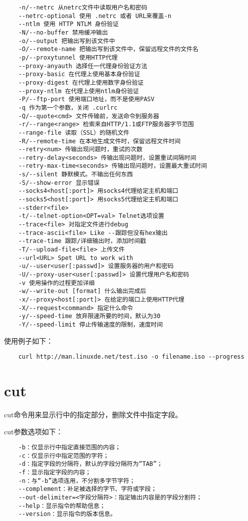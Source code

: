 \documentclass[a4paper,left=2.5cm,right=2.5cm,11pt]{article}
\begin{document}
\begin{lstlisting}
	-n/--netrc 从netrc文件中读取用户名和密码 
	--netrc-optional 使用 .netrc 或者 URL来覆盖-n 
	--ntlm 使用 HTTP NTLM 身份验证 
	-N/--no-buffer 禁用缓冲输出 
	-o/--output 把输出写到该文件中 
	-O/--remote-name 把输出写到该文件中，保留远程文件的文件名 
	-p/--proxytunnel 使用HTTP代理 
	--proxy-anyauth 选择任一代理身份验证方法 
	--proxy-basic 在代理上使用基本身份验证 
	--proxy-digest 在代理上使用数字身份验证 
	--proxy-ntlm 在代理上使用ntlm身份验证 
	-P/--ftp-port 使用端口地址，而不是使用PASV 
	-q 作为第一个参数，关闭 .curlrc 
	-Q/--quote<cmd> 文件传输前，发送命令到服务器 
	-r/--range<range> 检索来自HTTP/1.1或FTP服务器字节范围 
	--range-file 读取（SSL）的随机文件 
	-R/--remote-time 在本地生成文件时，保留远程文件时间 
	--retry<num> 传输出现问题时，重试的次数 
	--retry-delay<seconds> 传输出现问题时，设置重试间隔时间 
	--retry-max-time<seconds> 传输出现问题时，设置最大重试时间 
	-s/--silent 静默模式。不输出任何东西 
	-S/--show-error 显示错误 
	--socks4<host[:port]> 用socks4代理给定主机和端口 
	--socks5<host[:port]> 用socks5代理给定主机和端口 
	--stderr<file> 
	-t/--telnet-option<OPT=val> Telnet选项设置 
	--trace<file> 对指定文件进行debug 
	--trace-ascii<file> Like --跟踪但没有hex输出 
	--trace-time 跟踪/详细输出时，添加时间戳 
	-T/--upload-file<file> 上传文件 
	--url<URL> Spet URL to work with 
	-u/--user<user[:passwd]> 设置服务器的用户和密码 
	-U/--proxy-user<user[:passwd]> 设置代理用户名和密码 
	-v 使用操作的过程更加详细
	-w/--write-out [format] 什么输出完成后 
	-x/--proxy<host[:port]> 在给定的端口上使用HTTP代理 
	-X/--request<command> 指定什么命令 
	-y/--speed-time 放弃限速所要的时间，默认为30 
	-Y/--speed-limit 停止传输速度的限制，速度时间
	\end{lstlisting}

	使用例子如下：
	\begin{lstlisting}
	curl http://man.linuxde.net/test.iso -o filename.iso --progress
	\end{lstlisting}

\section{cut}
	cut命令用来显示行中的指定部分，删除文件中指定字段。\par

	cut参数选项如下：
	\begin{lstlisting}
	-b：仅显示行中指定直接范围的内容； 
	-c：仅显示行中指定范围的字符； 
	-d：指定字段的分隔符，默认的字段分隔符为“TAB”； 
	-f：显示指定字段的内容； 
	-n：与“-b”选项连用，不分割多字节字符； 
	--complement：补足被选择的字节、字符或字段； 
	--out-delimiter=<字段分隔符>：指定输出内容是的字段分割符； 
	--help：显示指令的帮助信息； 
	--version：显示指令的版本信息。
	\end{lstlisting}
\end{document}
